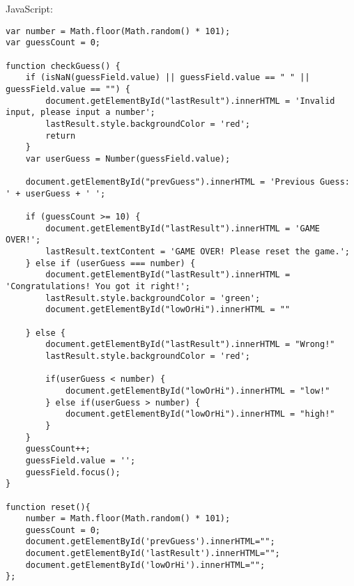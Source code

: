 \documentclass[a4paper, 11pt]{report}
\begin{document}
\newline
\newline
JavaScript:
\newline
\begin{verbatim}
var number = Math.floor(Math.random() * 101);
var guessCount = 0;

function checkGuess() {
    if (isNaN(guessField.value) || guessField.value == " " || guessField.value == "") {
        document.getElementById("lastResult").innerHTML = 'Invalid input, please input a number';
        lastResult.style.backgroundColor = 'red';
        return
    }
    var userGuess = Number(guessField.value);

    document.getElementById("prevGuess").innerHTML = 'Previous Guess: ' + userGuess + ' ';

    if (guessCount >= 10) {
        document.getElementById("lastResult").innerHTML = 'GAME OVER!';
        lastResult.textContent = 'GAME OVER! Please reset the game.';
    } else if (userGuess === number) {
        document.getElementById("lastResult").innerHTML = 'Congratulations! You got it right!';
        lastResult.style.backgroundColor = 'green';
        document.getElementById("lowOrHi").innerHTML = ""

    } else {
        document.getElementById("lastResult").innerHTML = "Wrong!"
        lastResult.style.backgroundColor = 'red';
        
        if(userGuess < number) {
            document.getElementById("lowOrHi").innerHTML = "low!"
        } else if(userGuess > number) {
            document.getElementById("lowOrHi").innerHTML = "high!"
        }
    }
    guessCount++;
    guessField.value = '';
    guessField.focus();
}

function reset(){
    number = Math.floor(Math.random() * 101);
    guessCount = 0;
    document.getElementById('prevGuess').innerHTML="";
    document.getElementById('lastResult').innerHTML="";
    document.getElementById('lowOrHi').innerHTML="";
};
\end{verbatim}
\end{document}
